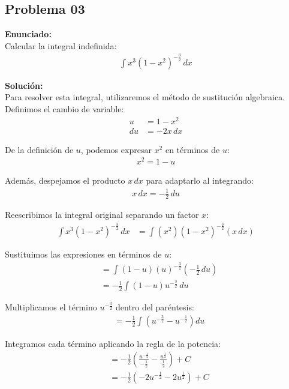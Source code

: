 \subsection*{Problema 03}

\textbf{Enunciado:} \\
Calcular la integral indefinida:
\begin{align*}
\int x^3 (1 - x^2)^{-\frac{3}{2}} \, dx
\end{align*}

\textbf{Solución:} \\
Para resolver esta integral, utilizaremos el método de sustitución algebraica. 
Definimos el cambio de variable:
\begin{align*}
u &= 1 - x^2 \\
du &= -2x \, dx
\end{align*}

De la definición de $u$, podemos expresar $x^2$ en términos de $u$:
\begin{align*}
x^2 = 1 - u
\end{align*}

Además, despejamos el producto $x \, dx$ para adaptarlo al integrando:
\begin{align*}
x \, dx = -\frac{1}{2} \, du
\end{align*}

Reescribimos la integral original separando un factor $x$:
\begin{align*}
\int x^3 (1 - x^2)^{-\frac{3}{2}} \, dx &= \int (x^2) (1 - x^2)^{-\frac{3}{2}} (x \, dx)
\end{align*}

Sustituimos las expresiones en términos de $u$:
\begin{align*}
&= \int (1 - u) (u)^{-\frac{3}{2}} \left(-\frac{1}{2} \, du\right) \\
&= -\frac{1}{2} \int (1 - u) u^{-\frac{3}{2}} \, du
\end{align*}

Multiplicamos el término $u^{-\frac{3}{2}}$ dentro del paréntesis:
\begin{align*}
&= -\frac{1}{2} \int \left( u^{-\frac{3}{2}} - u^{-\frac{1}{2}} \right) du
\end{align*}

Integramos cada término aplicando la regla de la potencia:
\begin{align*}
&= -\frac{1}{2} \left( \frac{u^{-\frac{1}{2}}}{-\frac{1}{2}} - \frac{u^{\frac{1}{2}}}{\frac{1}{2}} \right) + C \\
&= -\frac{1}{2} \left( -2u^{-\frac{1}{2}} - 2u^{\frac{1}{2}} \right) + C
\end{align*}

